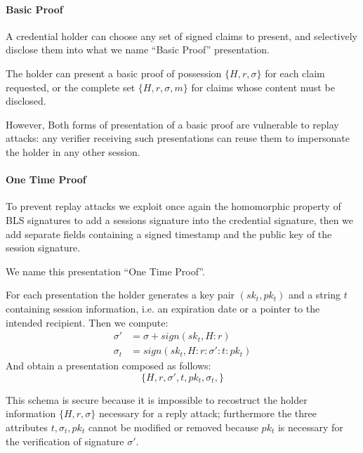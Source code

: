 \paragraph{Basic Proof}

A credential holder can choose any set of signed claims to present,
and selectively disclose them into what we name ``Basic Proof''
presentation.

The holder can present a basic proof of possession $\{ H, r, \sigma
\}$ for each claim requested, or the complete set $\{ H, r, \sigma, m
\}$ for claims whose content must be disclosed.

However, Both forms of presentation of a basic proof are vulnerable to
replay attacks: any verifier receiving such presentations can reuse
them to impersonate the holder in any other session.

\paragraph{One Time Proof}

To prevent replay attacks we exploit once again the homomorphic
property of BLS signatures to add a sessions signature into the
credential signature, then we add separate fields containing a signed
timestamp and the public key of the session signature.

We name this presentation ``One Time Proof''.

For each presentation the holder generates a key pair $(sk_t, pk_t)$
and a string $t$ containing session information, i.e. an expiration
date or a pointer to the intended recipient. Then we compute:
\begin{equation*}
    \begin{split}
        \sigma' &= \sigma + sign(sk_t, H : r) \\
        \sigma_{t} &= sign(sk_t, H : r : \sigma' : t : pk_t)
    \end{split}
\end{equation*}
And obtain a presentation composed as follows:
\begin{equation*}
    \{H, r, \sigma', t, pk_t,  \sigma_t,\}
\end{equation*}

This schema is secure because it is impossible to recostruct the
holder information $\{H,r,\sigma\}$ necessary for a reply attack;
furthermore the three attributes $t,\sigma_t, pk_t$ cannot be modified
or removed because $pk_t$ is necessary for the verification of
signature $\sigma'$.

